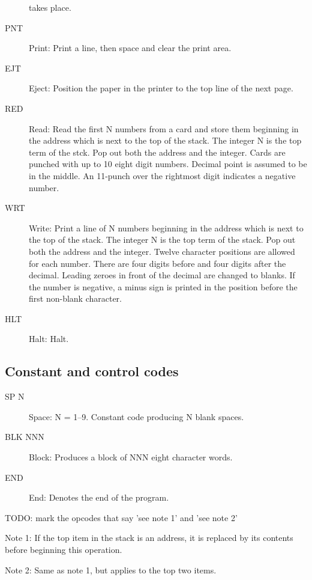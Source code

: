 \documentclass[twocolumn]{article}
\begin{document}
\begin{description}
takes place.
\item[PNT] Print: Print a line, then space and clear the print area.
\item[EJT] Eject: Position the paper in the printer to the top line of the next page.
\item[RED] Read: Read the first N numbers from a card and store them beginning
in the address which is next to the top of the stack.
The integer N is the top term of the stck.
Pop out both the address and the integer.
Cards are punched with up to 10 eight digit numbers.
Decimal point is assumed to be in the middle.
An 11-punch over the rightmost digit indicates a negative number.
\item[WRT] Write: Print a line of N numbers beginning in the address which
is next to the top of the stack.
The integer N is the top term of the stack.
Pop out both the address and the integer.
Twelve character positions are allowed for each number.
There are four digits before and four digits after the decimal.
Leading zeroes in front of the decimal are changed to blanks.
If the number is negative, a minus sign is printed in the position before
the first non-blank character.
\item[HLT] Halt: Halt.
\end{description}
\subsection{Constant and control codes}
\begin{description}
\item[SP  N] Space: N = 1--9. Constant code producing N blank spaces.
\item[BLK NNN] Block: Produces a block of NNN eight character words.
\item[END] End: Denotes the end of the program.
\end{description}

TODO: mark the opcodes that say 'see note 1' and 'see note 2'

Note 1: If the top item in the stack is an address, it is replaced by its
contents before beginning this operation.

Note 2: Same as note 1, but applies to the top two items.
\end{document}
